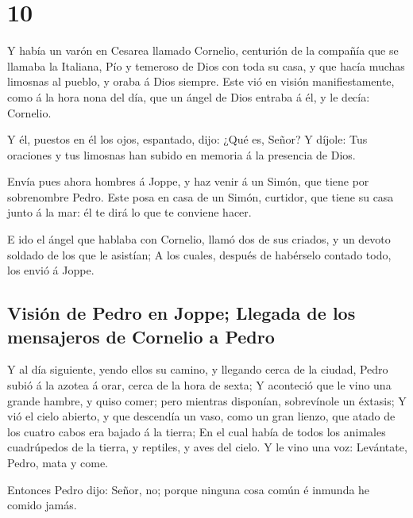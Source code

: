 \hypertarget{section-9}{%
\section{10}\label{section-9}}

 Y había un varón en Cesarea llamado Cornelio, centurión
de la compañía que se llamaba la Italiana,  Pío y temeroso
de Dios con toda su casa, y que hacía muchas limosnas al pueblo, y oraba
á Dios siempre.  Este vió en visión manifiestamente, como
á la hora nona del día, que un ángel de Dios entraba á él, y le decía:
Cornelio.

 Y él, puestos en él los ojos, espantado, dijo: ¿Qué es,
Señor? Y díjole: Tus oraciones y tus limosnas han subido en memoria á la
presencia de Dios.

 Envía pues ahora hombres á Joppe, y haz venir á un Simón,
que tiene por sobrenombre Pedro.  Este posa en casa de un
Simón, curtidor, que tiene su casa junto á la mar: él te dirá lo que te
conviene hacer.

 E ido el ángel que hablaba con Cornelio, llamó dos de sus
criados, y un devoto soldado de los que le asistían;  A
los cuales, después de habérselo contado todo, los envió á Joppe.

\hypertarget{visiuxf3n-de-pedro-en-joppe-llegada-de-los-mensajeros-de-cornelio-a-pedro}{%
\subsection{Visión de Pedro en Joppe; Llegada de los mensajeros de
Cornelio a
Pedro}\label{visiuxf3n-de-pedro-en-joppe-llegada-de-los-mensajeros-de-cornelio-a-pedro}}

 Y al día siguiente, yendo ellos su camino, y llegando
cerca de la ciudad, Pedro subió á la azotea á orar, cerca de la hora de
sexta;  Y aconteció que le vino una grande hambre, y
quiso comer; pero mientras disponían, sobrevínole un éxtasis;
 Y vió el cielo abierto, y que descendía un vaso, como un
gran lienzo, que atado de los cuatro cabos era bajado á la tierra;
 En el cual había de todos los animales cuadrúpedos de la
tierra, y reptiles, y aves del cielo.  Y le vino una voz:
Levántate, Pedro, mata y come.

 Entonces Pedro dijo: Señor, no; porque ninguna cosa
común é inmunda he comido jamás.

